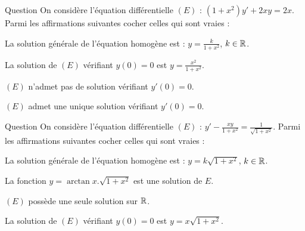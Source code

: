 \begin{multi}[multiple,feedback=
{La solution générale de l'équation homogène est : \(\displaystyle Y=\frac{k}{1+x^2}\), \(k\in \Rr\), et \(y_0=1\) est une solution particulière. La solution générale de \((E)\) est :
\[y=1+\frac{k}{1+x^2},\quad k\in \Rr.\]
La condition \(y(0)=0\) donne \(k=-1\). Par ailleurs, en posant \(x=0\) dans \((E)\), on obtient \(y'(0)=0\). Donc toute solution de \((E)\) vérifient la condition \(y'(0)=0\).
}]{Question}
On considère l'équation différentielle \((E)\) : \(\displaystyle (1+x^2)y'+2xy=2x\). Parmi les affirmations suivantes cocher celles qui sont vraies :

    \item* La solution générale de l'équation homogène est : \(\displaystyle y=\frac{k}{1+x^2}\), \(k\in \Rr\).
    \item* La solution de \((E)\) vérifiant \(y(0)=0\) est \(\displaystyle y=\frac{x^2}{1+x^2}\).
    \item \((E)\) n'admet pas de solution vérifiant \(y'(0)=0\).
    \item \((E)\) admet une unique solution vérifiant \(y'(0)=0\).
\end{multi}


\begin{multi}[multiple,feedback=
{La solution générale de \((E)\) est \(y=(k+\arctan x)\sqrt{1+x^2}\), \(k\in \Rr\). Celle vérifiant \(y(0)=0\) est \(y=\arctan x.\sqrt{1+x^2}\).
}]{Question}
On considère l'équation différentielle \((E)\) : \(\displaystyle y'-\frac{xy}{1+x^2}=\frac{1}{\sqrt{1+x^2}}\). Parmi les affirmations suivantes cocher celles qui sont vraies :

    \item* La solution générale de l'équation homogène est : \(y=k\sqrt{1+x^2}\), \(k\in \Rr\).
    \item* La fonction \(y=\arctan x.\sqrt{1+x^2}\) est une solution de \(E\).
    \item \((E)\) possède une seule solution sur \(\mathbb{R}\).
    \item La solution de \((E)\) vérifiant \(y(0)=0\) est \(y=x\sqrt{1+x^2}\).
\end{multi}


